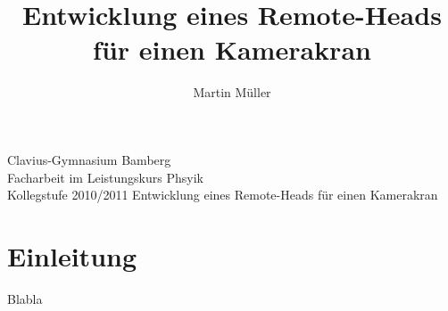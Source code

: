 \documentclass[a4paper, 12pt, bibtotocnumbered, liststotocnumbered]{scrartcl}
\begin{document}
	\title{Entwicklung eines Remote-Heads für einen Kamerakran}
	\author{Martin Müller}

	\begin{center}
		\large{Clavius-Gymnasium Bamberg}\\
		\Large{Facharbeit im Leistungskurs Phsyik}\\
		\large{Kollegstufe 2010/2011}
		\vfill{Entwicklung eines Remote-Heads für einen Kamerakran}
	\end{center}

	\pagebreak

	\tableofcontents

	\pagebreak

	\section{Einleitung}
	Blabla

	\nocite{*}
	
	

	\listoffigures
\end{document}
